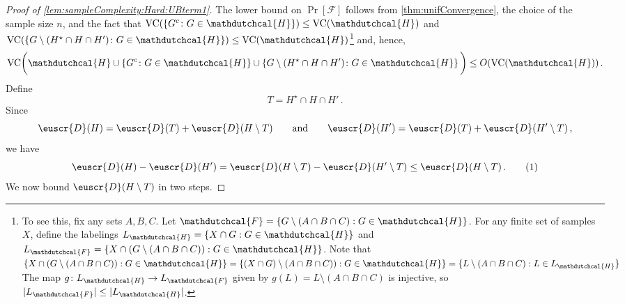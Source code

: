 \documentclass[11pt]{article}
\theoremstyle{plain}
\theoremstyle{definition}
\theoremstyle{remark}
\newcommand{\yesnum}{\addtocounter{equation}{1}\tag{\theequation}}
\newcommand{\qquadtext}[1]{\qquad\text{#1}\qquad}
\newcommand{\qquadand}{\qquadtext{and}}
\newcommand{\bbinparen}[1]{\bigg(#1\bigg)}
\newcommand{\inbrace}[1]{\left\{#1\right\}}
\newcommand{\evF}{\ensuremath{\mathscr{F}}}
\newcommand{\vc}{\textrm{\rm VC}}
\newcommand{\customcal}[1]{\euscr{#1}}
\newcommand{\cD}{\customcal{D}}
\newcommand{\hypo}[1]{\mathdutchcal{#1}}
\newcommand{\hyF}{\hypo{F}}
\newcommand{\hyH}{\hypo{H}}
\newcommand{\optset}{{H^\star}}
\begin{document}
            \begin{proof}[Proof of \cref{lem:sampleComplexity:Hard:UBterm1}]
                The lower bound on $\Pr[\evF]$ follows from \cref{thm:unifConvergence}, the choice of the sample size $n$, and the fact that $\vc{(\inbrace{G^c\colon G\in \hyH})}\leq \vc{(\hyH)}$ and $\vc{(\inbrace{G\setminus (\optset \cap H\cap H')\colon G\in \hyH})}\leq \vc{(\hyH)}$\footnote{To see this, fix any sets $A,B,C.$
                    Let \(\hyF=\{G\setminus (A\cap B\cap C):G\in \hyH\}\). For any finite set of samples \(X\), define the labelings \(L_{\hyH}=\{X\cap G: G\in \hyH\}\) and \(L_{\hyF}=\{X\cap (G\setminus (A\cap B\cap C)):G\in \hyH\}\). 
                    Note that $\{X\cap (G\setminus (A\cap B\cap C)):G\in \hyH\}=\{(X\cap G)\setminus (A\cap B\cap C)):G\in{\hyH}\}=\{L\setminus (A\cap B\cap C):L\in L_{\hyH}\}$
                    The map \(g\colon L_{\hyH}\to L_{\hyF}\) given by \(g(L)=L\setminus (A\cap B\cap C)\) is injective, so \(|L_{\hyF}|\le |L_{\hyH}|\).} and, hence,
                \[
                    \vc{\bbinparen{\hyH\cup\inbrace{G^c\colon G\in \hyH}\cup \inbrace{G\setminus (\optset \cap H\cap H')\colon G\in \hyH}}}
                    \leq O(\vc{(\hyH)})
                    \,.
                \] 
                Define 
                \[
                    T = \optset \cap H\cap H'\,.
                \]
                Since
                \[
                    \cD(H) = \cD(T) + \cD(H\setminus T)
                    \qquadand
                    \cD(H') = \cD(T) + \cD(
                    H'\setminus T)\,,
                \]
                we have
                \[
                    \cD(H)-\cD(H')
                    = 
                    \cD(H\setminus T)-\cD(H'\setminus T)
                    \leq \cD(H\setminus T)\,.
                    \yesnum\label{eq:sampleComplexity:UBterm1:ub}
                \]
                We now bound $\cD(H\setminus T)$ in two steps.


\end{proof}
\end{document}
